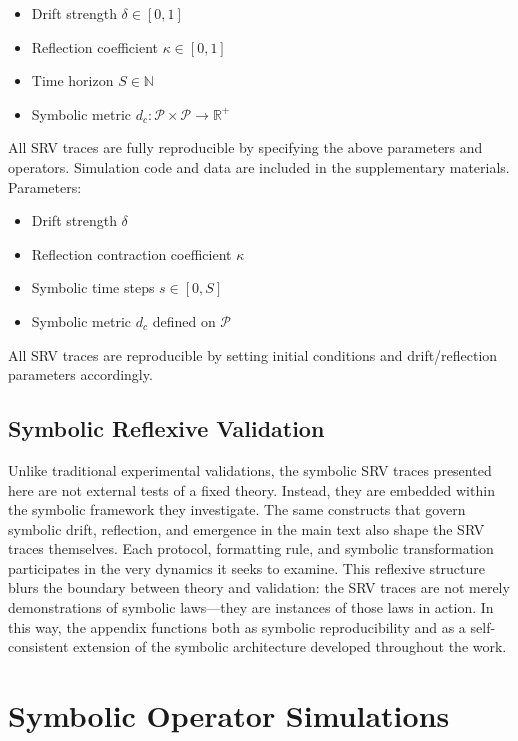 \begin{itemize}
    \item Drift strength \( \delta \in [0, 1] \)
    \item Reflection coefficient \( \kappa \in [0, 1] \)
    \item Time horizon \( S \in \mathbb{N} \)
    \item Symbolic metric \( d_c: \mathcal{P} \times \mathcal{P} \rightarrow \mathbb{R}^+ \)
\end{itemize}
All SRV traces are fully reproducible by specifying the above parameters and operators. Simulation code and data are included in the supplementary materials.
Parameters:
\begin{itemize}
    \item Drift strength \( \delta \)
    \item Reflection contraction coefficient \( \kappa \)
    \item Symbolic time steps \( s \in [0, S] \)
    \item Symbolic metric \( d_c \) defined on \( \mathcal{P} \)
\end{itemize}
All SRV traces are reproducible by setting initial conditions and drift/reflection parameters accordingly.
\subsection*{Symbolic Reflexive Validation}
\label{subsec:appB_symbolic_reflexive_validation}
Unlike traditional experimental validations, the symbolic SRV traces presented here are not external tests of a fixed theory. Instead, they are embedded within the symbolic framework they investigate.
The same constructs that govern symbolic drift, reflection, and emergence in the main text also shape the SRV traces themselves. Each protocol, formatting rule, and symbolic transformation participates in the very dynamics it seeks to examine.
This reflexive structure blurs the boundary between theory and validation: the SRV traces are not merely demonstrations of symbolic laws—they are instances of those laws in action. In this way, the appendix functions both as symbolic reproducibility and as a self-consistent extension of the symbolic architecture developed throughout the work.
\section*{Symbolic Operator Simulations}





